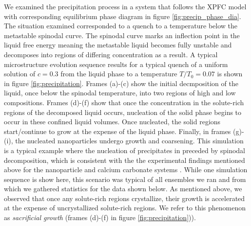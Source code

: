  
We examined the precipitation process in a system that follows the XPFC model
with corresponding equilibrium phase diagram in figure
\ref{fig:precip_phase_dia}. The situation examined corresponded to a quench to
a temperature below the metastable spinodal curve. The spinodal curve marks an
inflection point in the liquid free energy meaning the metastable liquid
becomes fully unstable and decomposes into regions of differing concentration
as a result. A typical microstructure evolution sequence results for a typical
quench of a uniform solution of $c = 0.3$ from the liquid phase to a
temperature $T/T_0 = 0.07$ is shown in figure \ref{fig:precipitation}.
Frames (a)-(c) show the initial decmposition of the liquid, once below the
spinodal temperature, into two regions of high and low compositions. Frames
(d)-(f) show that once the concentration in the solute-rich regions of the
decomposed liquid occurs, nucleation of the solid phase begins to occur in
these confined liquid volumes. Once nucleated, the solid regions start/continue
to grow at the expense of the liquid phase. Finally, in frames (g)-(i), the
nucleated nanoparticles undergo growth and coarsening. This simulation is a
typical example where the nucleation of precipitates in preceded by spinodal
decomposition, which is consistent with the  the experimental findings
mentioned above for the nanoparticle and calcium carbonate systems \cite{LOH17,
WALLACE13}. While one simulation sequence is show here, this scenario was
typical of all ensembles we ran and from which we gathered statistics for the
data shown below. As mentioned above, we observed that once any solute-rich
regions crystallize, their growth is accelerated at the expense of
uncrystallized solute-rich regions. We refer to this phenomenon as
\textit{sacrificial growth} (frames (d)-(f) in figure
\ref{fig:precipitation})). 
%
